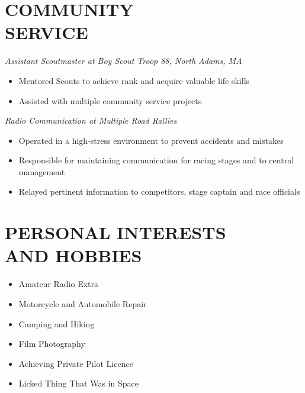 \documentclass[line,margin]{res}
\begin{document}
\begin{resume}
\section{COMMUNITY \\ SERVICE}  
{\sl	Assistant Scoutmaster at Boy Scout Troop 88, North Adams, MA}
	\begin{itemize}  \itemsep -2pt %
		\item Mentored Scouts to achieve rank and acquire valuable life skills%
		\item Assisted with multiple community service projects
	\end{itemize}
	\vspace{-5pt}
	{\sl	Radio Communication at Multiple Road Rallies}
	\begin{itemize}  \itemsep -2pt %
		\item Operated in a high-stress environment to prevent accidents and mistakes		
		\item Responsible for maintaining communication for racing stages and to central management
		\item Relayed pertinent information to competitors, stage captain and race officials
	\end{itemize}

\section{PERSONAL INTERESTS \\ AND HOBBIES}             
				\begin{multicols}{2}
					\begin{itemize}
						\itemsep -2pt
	\item[]Amateur Radio Extra
	\item[]Motorcycle and Automobile Repair
	\item[]Camping and Hiking
	\item[]Film Photography
	\item[]Achieving Private Pilot Licence
	\item[]Licked Thing That Was in Space

	\end{itemize}
	\end{multicols}


\end{resume}
\end{document}
